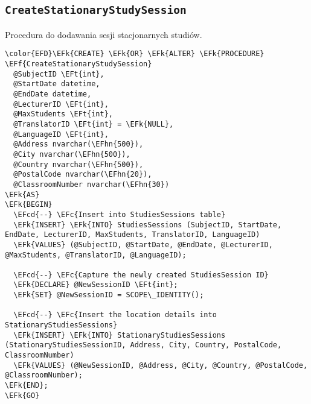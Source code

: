 \documentclass[11pt]{article}
\newcommand{\EFc}[1]{\textcolor{EFc}{\textit{#1}}} %
\newcommand{\EFcd}[1]{\textcolor{EFcd}{\textit{#1}}} %
\newcommand{\EFk}[1]{\textcolor{EFk}{\textbf{#1}}} %
\newcommand{\EFf}[1]{\textcolor{EFf}{#1}} %
\newcommand{\EFt}[1]{\textcolor{EFt}{\textbf{#1}}} %
\newcommand{\EFhn}[1]{\textcolor{EFhn}{#1}} %
\begin{document}
\subsection{\texttt{CreateStationaryStudySession}}
\label{sec:org4693f24}
Procedura do dodawania sesji stacjonarnych studiów.
\begin{Code}
\begin{Verbatim}
\color{EFD}\EFk{CREATE} \EFk{OR} \EFk{ALTER} \EFk{PROCEDURE} \EFf{CreateStationaryStudySession}
  @SubjectID \EFt{int},
  @StartDate datetime,
  @EndDate datetime,
  @LecturerID \EFt{int},
  @MaxStudents \EFt{int},
  @TranslatorID \EFt{int} = \EFk{NULL},
  @LanguageID \EFt{int},
  @Address nvarchar(\EFhn{500}),
  @City nvarchar(\EFhn{500}),
  @Country nvarchar(\EFhn{500}),
  @PostalCode nvarchar(\EFhn{20}),
  @ClassroomNumber nvarchar(\EFhn{30})
\EFk{AS}
\EFk{BEGIN}
  \EFcd{--} \EFc{Insert into StudiesSessions table}
  \EFk{INSERT} \EFk{INTO} StudiesSessions (SubjectID, StartDate, EndDate, LecturerID, MaxStudents, TranslatorID, LanguageID)
  \EFk{VALUES} (@SubjectID, @StartDate, @EndDate, @LecturerID, @MaxStudents, @TranslatorID, @LanguageID);

  \EFcd{--} \EFc{Capture the newly created StudiesSession ID}
  \EFk{DECLARE} @NewSessionID \EFt{int};
  \EFk{SET} @NewSessionID = SCOPE\_IDENTITY();

  \EFcd{--} \EFc{Insert the location details into StationaryStudiesSessions}
  \EFk{INSERT} \EFk{INTO} StationaryStudiesSessions (StationaryStudiesSessionID, Address, City, Country, PostalCode, ClassroomNumber)
  \EFk{VALUES} (@NewSessionID, @Address, @City, @Country, @PostalCode, @ClassroomNumber);
\EFk{END};
\EFk{GO}
\end{Verbatim}
\end{Code}
\end{document}
